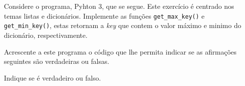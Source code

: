 \documentclass[12pt,varwidth=16cm,border=1pt]{standalone}
\begin{document}
Considere o programa, Pyhton 3, que se segue. Este exercício é centrado nos temas listas e dicionários. Implemente as funções \verb+get_max_key()+ e \verb+get_min_key()+, estas retornam a \textit{key} que contem o valor máximo e minimo do dicionário, respectivamente.



Acrescente a este programa o código que lhe permita indicar se as
afirmações seguintes são verdadeiras ou falsas.

Indique se é verdadeiro ou falso.
\end{document}
